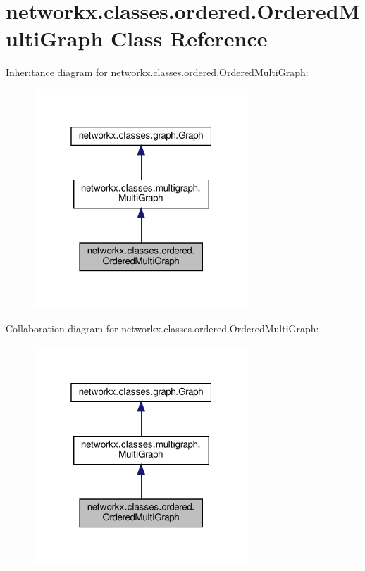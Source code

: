 \hypertarget{classnetworkx_1_1classes_1_1ordered_1_1OrderedMultiGraph}{}\section{networkx.\+classes.\+ordered.\+Ordered\+Multi\+Graph Class Reference}
\label{classnetworkx_1_1classes_1_1ordered_1_1OrderedMultiGraph}


Inheritance diagram for networkx.\+classes.\+ordered.\+Ordered\+Multi\+Graph\+:
\nopagebreak
\begin{figure}[H]
\begin{center}
\leavevmode
\includegraphics[width=229pt]{classnetworkx_1_1classes_1_1ordered_1_1OrderedMultiGraph__inherit__graph}
\end{center}
\end{figure}


Collaboration diagram for networkx.\+classes.\+ordered.\+Ordered\+Multi\+Graph\+:
\nopagebreak
\begin{figure}[H]
\begin{center}
\leavevmode
\includegraphics[width=229pt]{classnetworkx_1_1classes_1_1ordered_1_1OrderedMultiGraph__coll__graph}
\end{center}
\end{figure}
